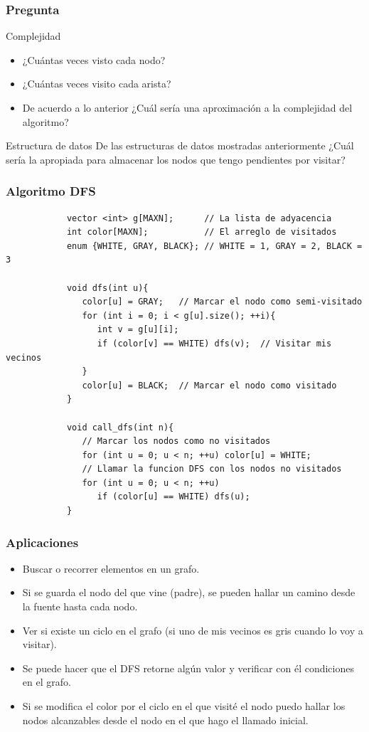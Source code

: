 \documentclass{beamer}
\begin{document}
	\begin{frame}
		\frametitle{Pregunta}
		\begin{alertblock}{Complejidad}
			\begin{itemize}
				\item ¿Cuántas veces visto cada nodo?
				\item ¿Cuántas veces visito cada arista?
				\item De acuerdo a lo anterior ¿Cuál sería una aproximación a la complejidad del algoritmo?
			\end{itemize}
		\end{alertblock}
		\pause
		\begin{alertblock}{Estructura de datos}
			De las estructuras de datos mostradas anteriormente ¿Cuál sería la apropiada para almacenar los nodos que tengo pendientes por visitar?
		\end{alertblock}
	\end{frame}
	
	\begin{frame}[fragile]
		\frametitle{Algoritmo DFS}
		\begin{lstlisting}
			vector <int> g[MAXN];      // La lista de adyacencia
			int color[MAXN];           // El arreglo de visitados
			enum {WHITE, GRAY, BLACK}; // WHITE = 1, GRAY = 2, BLACK = 3

			void dfs(int u){
			   color[u] = GRAY;   // Marcar el nodo como semi-visitado
			   for (int i = 0; i < g[u].size(); ++i){
			      int v = g[u][i];
			      if (color[v] == WHITE) dfs(v);  // Visitar mis vecinos
			   }
			   color[u] = BLACK;  // Marcar el nodo como visitado
			}

			void call_dfs(int n){
			   // Marcar los nodos como no visitados
			   for (int u = 0; u < n; ++u) color[u] = WHITE;
			   // Llamar la funcion DFS con los nodos no visitados
			   for (int u = 0; u < n; ++u)
			      if (color[u] == WHITE) dfs(u);
			}
		\end{lstlisting}
	\end{frame}
	
	\begin{frame}
		\frametitle{Aplicaciones}
		\begin{itemize}
			\item Buscar o recorrer elementos en un grafo.
			\item Si se guarda el nodo del que vine (padre), se pueden hallar un camino desde la fuente hasta cada nodo.
			\item Ver si existe un ciclo en el grafo (si uno de mis vecinos es gris cuando lo voy a visitar).
			\item Se puede hacer que el DFS retorne algún valor y verificar con él condiciones en el grafo.
			\item Si se modifica el color por el ciclo en el que visité el nodo puedo hallar los nodos alcanzables desde el nodo en el que hago el llamado inicial.
		\end{itemize}
	\end{frame}
	
\end{document}
